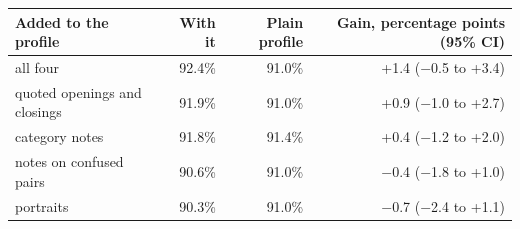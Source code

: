 \begin{tabular}{lrrr}
\toprule
Added to the profile & With it & Plain profile & Gain, percentage points (95\% CI) \\
\midrule
all four & 92.4\% & 91.0\% & +1.4 ($-$0.5 to +3.4) \\
quoted openings and closings & 91.9\% & 91.0\% & +0.9 ($-$1.0 to +2.7) \\
category notes & 91.8\% & 91.4\% & +0.4 ($-$1.2 to +2.0) \\
notes on confused pairs & 90.6\% & 91.0\% & $-$0.4 ($-$1.8 to +1.0) \\
portraits & 90.3\% & 91.0\% & $-$0.7 ($-$2.4 to +1.1) \\
\bottomrule
\end{tabular}
